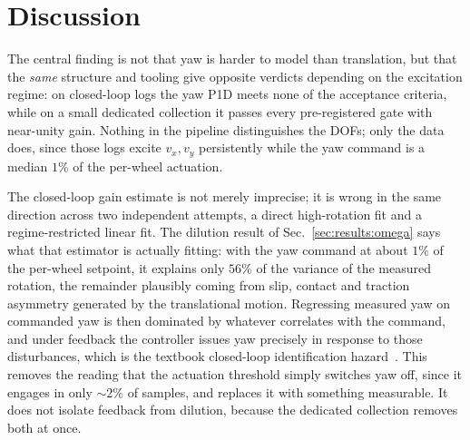 \section{Discussion}
\label{sec:discussion}

The central finding is not that yaw is harder to model than translation, but that the \emph{same} structure and tooling give opposite verdicts depending on the excitation regime: on closed-loop logs the yaw P1D meets none of the acceptance criteria, while on a small dedicated collection it passes every pre-registered gate with near-unity gain. Nothing in the pipeline distinguishes the DOFs; only the data does, since those logs excite $v_x,v_y$ persistently while the yaw command is a median $1\%$ of the per-wheel actuation.

The closed-loop gain estimate is not merely imprecise; it is wrong in the same direction across two independent attempts, a direct high-rotation fit and a regime-restricted linear fit. The dilution result of Sec.~\ref{sec:results:omega} says what that estimator is actually fitting: with the yaw command at about $1\%$ of the per-wheel setpoint, it explains only $56\%$ of the variance of the measured rotation, the remainder plausibly coming from slip, contact and traction asymmetry generated by the translational motion. Regressing measured yaw on commanded yaw is then dominated by whatever correlates with the command, and under feedback the controller issues yaw precisely in response to those disturbances, which is the textbook closed-loop identification hazard~\cite{gustavsson1977identification,vandenhof1998closedloop,forssell1999closedloop}. This removes the reading that the actuation threshold simply switches yaw off, since it engages in only ${\sim}2\%$ of samples, and replaces it with something measurable. It does not isolate feedback from dilution, because the dedicated collection removes both at once.

